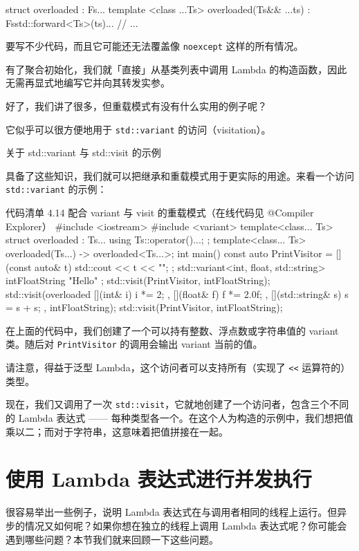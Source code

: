 \begin{codebox}
struct overloaded : Fs... {
template <class ...Ts>
overloaded(Ts&& ...ts) : Fs{std::forward<Ts>(ts)}...
{}
// ...
}
\end{codebox}

要写不少代码，而且它可能还无法覆盖像 \texttt{noexcept} 这样的所有情况。

有了聚合初始化，我们就「直接」从基类列表中调用 Lambda 的构造函数，因此无需再显式地编写它并向其转发实参。

好了，我们讲了很多，但重载模式有没有什么实用的例子呢？

它似乎可以很方便地用于 \texttt{std::variant} 的访问（visitation）。

关于 std::variant 与 std::visit 的示例

具备了这些知识，我们就可以把继承和重载模式用于更实际的用途。来看一个访问 \texttt{std::variant} 的示例：

\begin{codeboxt}{代码清单 4.14 配合 variant 与 visit 的重载模式（在线代码见 @Compiler Explorer）}
#include <iostream>
#include <variant>
template<class... Ts> struct overloaded : Ts... { using Ts::operator()...; };
template<class... Ts> overloaded(Ts...) -> overloaded<Ts...>;
int main() {
const auto PrintVisitor = [](const auto& t) { std::cout << t << "\n"; };
std::variant<int, float, std::string> intFloatString { "Hello" };
std::visit(PrintVisitor, intFloatString);
std::visit(overloaded{
[](int& i) { i *= 2; },
[](float& f) { f *= 2.0f; },
[](std::string& s) { s = s + s; }
}, intFloatString);
std::visit(PrintVisitor, intFloatString);
}
\end{codeboxt}

在上面的代码中，我们创建了一个可以持有整数、浮点数或字符串值的 variant 类。随后对 \texttt{PrintVisitor} 的调用会输出 variant 当前的值。

请注意，得益于泛型 Lambda，这个访问者可以支持所有（实现了 \texttt{<<} 运算符的）类型。

现在，我们又调用了一次 \texttt{std::visit}，它就地创建了一个访问者，包含三个不同的 Lambda 表达式 —— 每种类型各一个。在这个人为构造的示例中，我们想把值乘以二；而对于字符串，这意味着把值拼接在一起。

\section{使用 Lambda 表达式进行并发执行}

很容易举出一些例子，说明 Lambda 表达式在与调用者相同的线程上运行。但异步的情况又如何呢？如果你想在独立的线程上调用 Lambda 表达式呢？你可能会遇到哪些问题？本节我们就来回顾一下这些问题。


